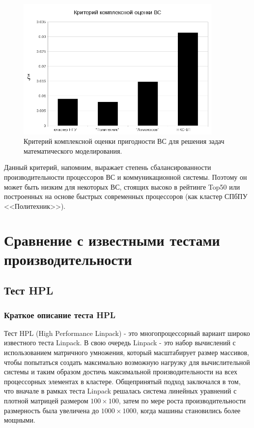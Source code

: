 \begin{figure}[htb]
	\begin{center}
		\includegraphics[height=7cm,keepaspectratio]{images/modern_PIC_params_xi_new.png}
	\end{center}
	\caption{Критерий комплексной оценки пригодности ВС для решения задач математического моделирования.}
	\label{xi}
\end{figure} 
Данный критерий, напомним, выражает степень сбалансированности производительности процессоров ВС и коммуникационной системы. Поэтому он может быть низким для некоторых ВС, стоящих высоко в рейтинге Top50 или построенных на основе быстрых современных процессоров (как кластер СПбПУ <<Политехник>>).




\section{Сравнение с известными тестами производительности}

\subsection{Тест HPL}

\subsubsection{Краткое описание теста HPL}
Тест HPL (High Performance Linpack) - это многопроцессорный вариант широко известного теста Linpack. В свою очередь Linpack - это набор вычислений с использованием матричного умножения, который масштабирует размер массивов, чтобы попытаться создать максимально возможную нагрузку для вычислительной системы и таким образом достичь максимальной производительности на всех процессорных элементах в кластере. Общепринятый подход заключался в том, что вначале в рамках теста Linpack решалась система линейных уравнений с плотной матрицей размером $ 100 \times 100$, затем по мере роста производительности размерность была увеличена до $1000 \times 1000$, когда машины становились более мощными.


